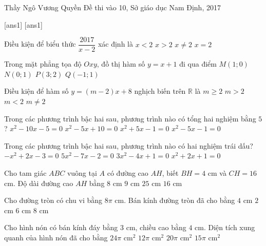 \begin{name}
{Thầy  Ngô Vương Quyền}
{Đề thi vào 10, Sở giáo dục Nam Định, 2017}
\end{name}
\setcounter{ex}{0}
[ans1]
[ans1]
\begin{ex}%
Điều kiện để biểu thức $\dfrac{2017}{x-2}$ xác định là
\choice
{$x<2$}
{$x>2$}
{\True $x\neq 2$}
{$x=2$}
\end{ex}

\begin{ex}%
Trong mặt phẳng tọa độ $Oxy$, đồ thị hàm số $y=x+1$ đi qua điểm 
\choice
{$M(1;0)$}
{\True $N(0;1)$}
{$P(3;2)$}
{$Q(-1;1)$}
\end{ex}

\begin{ex}%
Điều kiện để hàm số $y=(m-2)x+8$ nghịch biến trên $\mathbb{R}$ là
\choice
{$m\geq 2$}
{$m>2$}
{\True $m<2$}
{$m\neq 2$}
\end{ex}

\begin{ex}%
Trong các phương trình bậc hai sau, phương trình nào có tổng hai nghiệm bằng $5$?
\choice
{$x^2-10x-5=0$}
{$x^2-5x+10=0$}
{$x^2+5x-1=0$}
{\True $x^2-5x-1=0$}
\end{ex}

\begin{ex}%
Trong các phương trình bậc hai sau, phương trình nào có hai nghiệm trái dấu?
\choice
{$-x^2+2x-3=0$}
{\True $5x^2-7x-2=0$}
{$3x^2-4x+1=0$}
{$x^2+2x+1=0$}
\end{ex}

\begin{ex}%
Cho tam giác $ABC$ vuông tại $A$ có đường cao $AH$, biết $BH=4$ cm và $CH=16$ cm. Độ dài đường cao $AH$ bằng
\choice
{\True $8$ cm}
{$9$ cm}
{$25$ cm}
{$16$ cm}
\end{ex}

\begin{ex}%
Cho đường tròn có chu vi bằng $8\pi$ cm. Bán kính đường tròn đã cho bằng
\choice
{\True $4$ cm}
{$2$ cm}
{$6$ cm}
{$8$ cm}
\end{ex}

\begin{ex}%
Cho hình nón có bán kính đáy bằng $3$ cm, chiều cao bằng $4$ cm. Diện tích xung quanh của hình nón đã cho bằng
\choice
{$24\pi$ $\mathrm{cm}^2$}
{$12\pi$ $\mathrm{cm}^2$}
{$20\pi$ $\mathrm{cm}^2$}
{\True $15\pi$ $\mathrm{cm}^2$}
\end{ex}

